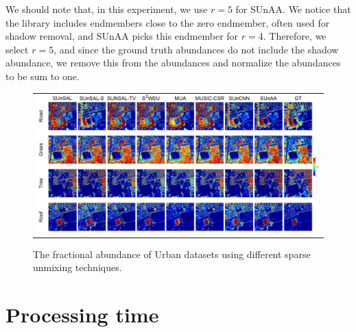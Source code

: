 We should note that, in this experiment, we use $r=5$ for SUnAA. We notice that the library includes endmembers close to the zero endmember, often used for shadow removal, and SUnAA picks this endmember for $r=4$. Therefore, we select $r=5$, and since the ground truth abundances do not include the shadow abundance, we remove this from the abundances and normalize the abundances to be sum to one.
\begin{table}[h]
\caption{Sparse unmixing experiments applied to Urban in terms of SRE. The best performances are shown in bold. The second best are underlined.}
	\label{tab:SRE_Urban}
\end{table}

\begin{figure}[h]\begin{center}
\begin{tabular}{c} 
\includegraphics[width=\textwidth]{fichiers_latex/Chap3/figs/Map_Urban_HAL.pdf}
 \end{tabular} \end{center} \caption{The fractional abundance of Urban datasets using different sparse unmixing techniques.}
 \label{Urban}
\end{figure}

\section{Processing time}

